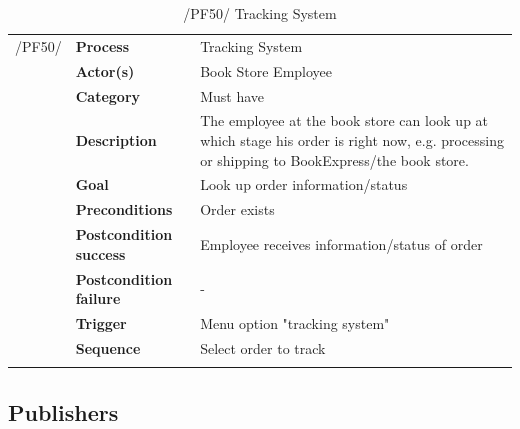 \documentclass[11pt,a4paper,oneside,svgnames]{report}
\begin{document}
\begin{table}[H]
\centering
\begin{tabular}{p{1.5cm}p{3cm}p{8cm}}
\cellcolor{white}/PF50/	& \textbf{Process} & Tracking System\\
\cellcolor{white}		& \textbf{Actor(s)} & Book Store Employee\\
\cellcolor{white}		& \textbf{Category} & Must have\\
\cellcolor{white}		& \textbf{Description}	 & The employee at the book store can look up at which stage his order is right now, e.g. processing or shipping to BookExpress/the book store.\\
\cellcolor{white}		& \textbf{Goal} & Look up order information/status\\
\cellcolor{white}		& \textbf{Preconditions} & Order exists\\
\cellcolor{white}		& \textbf{Postcondition success} & Employee receives information/status of order\\
\cellcolor{white}		& \textbf{Postcondition failure} & -\\
\cellcolor{white}		& \textbf{Trigger} & Menu option "tracking system"\\
\cellcolor{white}		& \textbf{Sequence} & Select order to track\\
\cellcolor{white}\hfill \\
\end{tabular}
\caption{/PF50/ Tracking System}
\label{tab:pf50}
\end{table}


\subsection{Publishers}
\end{document}
